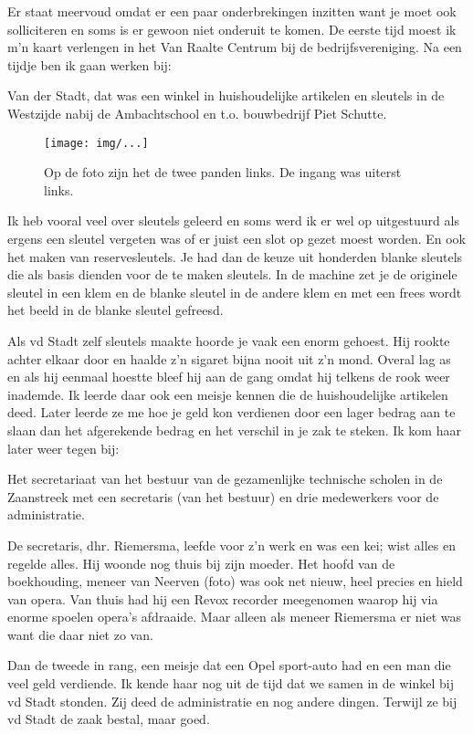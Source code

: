 \documentclass[10pt,twoside,openright]{memoir}
\begin{document}
Er staat meervoud omdat er een paar onderbrekingen inzitten want je moet ook solliciteren en soms is er gewoon niet onderuit te komen. De eerste tijd moest ik m'n kaart verlengen in het Van Raalte Centrum bij de bedrijfsvereniging. Na een tijdje ben ik gaan werken bij:

Van der Stadt, dat was een winkel in huishoudelijke artikelen en sleutels in de Westzijde nabij de Ambachtschool en t.o. bouwbedrijf Piet Schutte.

\begin{figure}[t]
\texttt{[image: img/...]}
\caption{Op de foto zijn het de twee panden links. De ingang was uiterst links.}
\end{figure}

Ik heb vooral veel over sleutels geleerd en soms werd ik er wel op uitgestuurd als ergens een sleutel vergeten was of er juist een slot op gezet moest worden. En ook het maken van reservesleutels. Je had dan de keuze uit honderden blanke sleutels die als basis dienden voor de te maken sleutels. In de machine zet je de originele sleutel in een klem en de blanke sleutel in de andere klem en met een frees wordt het beeld in de blanke sleutel gefreesd. 

Als vd Stadt zelf sleutels maakte hoorde je vaak een enorm gehoest. Hij rookte achter elkaar door en haalde z’n sigaret bijna nooit uit z’n mond. Overal lag as en als hij eenmaal hoestte bleef hij aan de gang omdat hij telkens de rook weer inademde. Ik leerde daar ook een meisje kennen die de huishoudelijke artikelen deed. Later leerde ze me hoe je geld kon verdienen door een lager bedrag aan te slaan dan het afgerekende bedrag en het verschil in je zak te steken. Ik kom haar later weer tegen bij: 

Het secretariaat van het bestuur van de gezamenlijke technische scholen in de Zaanstreek met een secretaris (van het bestuur) en drie medewerkers voor de administratie. 

De secretaris, dhr. Riemersma, leefde voor z'n werk en was een kei; wist alles en regelde alles. Hij woonde nog thuis bij zijn moeder. Het hoofd van de boekhouding, meneer van Neerven (foto) was ook net nieuw, heel precies en hield van opera. Van thuis had hij een Revox recorder meegenomen waarop hij via enorme spoelen opera's afdraaide. Maar alleen als meneer Riemersma er niet was want die daar niet zo van.

Dan de tweede in rang, een meisje dat een Opel sport-auto had en een man die veel geld verdiende. Ik kende haar nog uit de tijd dat we samen in de winkel bij vd Stadt stonden. Zij deed de administratie en nog andere dingen. Terwijl ze bij vd Stadt de zaak bestal, maar goed.
\end{document}
